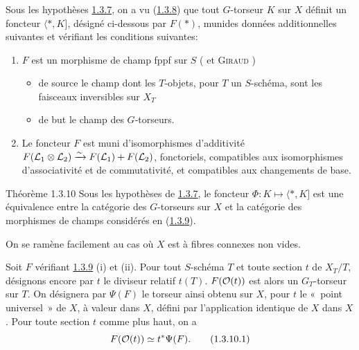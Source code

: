 \documentclass[10pt]{../fichiers-configuration-latex/smfart}
\begin{document}
\subsubsection{}
Sous les hypothèses \hyperref[XVIII.subsubsec1.3.7]{1.3.7}, 
on a vu (\hyperref[XVIII.for1.3.8]{1.3.8}) que tout $G$-torseur $K$
sur $X$ définit un foncteur $\langle \ast,K]$, désigné ci-dessous par
$F(\ast)$, 
muni\pageoriginale des données additionnelles suivantes et vérifiant
les conditions suivantes:
\begin{enumerate}
\renewcommand{\theenumi}{\roman{enumi}}
\renewcommand{\labelenumi}{(\theenumi)}
\item $F$ est un morphisme de champ fppf sur $S$
  ( et \textsc{Giraud} 
\cite{SGA4-18:1})
\begin{itemize}
\item[--] de source le champ dont les $T$-objets, pour $T$ un
$S$-schéma, sont les faisceaux inversibles sur $X_{T}$

\item[--] de but le champ des $G$-torseurs.
\end{itemize}

\item Le foncteur $F$ est muni d'isomorphismes d'additivité
$F({\mathcal L}_{1}\otimes {\mathcal L}_{2})\xrightarrow{\sim}F({\mathcal L}_{1})+F({\mathcal L}_{2})$,
fonctoriels, compatibles aux isomorphismes d'associativité et de
commutativité, et compatibles aux changements de base.
\end{enumerate}

\begin{enonce*}{Théorème 1.3.10}
Sous les hypothèses de \hyperref[XVIII.subsubsec1.3.7]{1.3.7}, le foncteur
$\Phi:K\mapsto \langle \ast,K]$ est 
une équivalence entre la catégorie des $G$-torseurs sur $X$ et la
catégorie des morphismes de champs considérés en
(\hyperref[XVIII.subsubsec1.3.9]{1.3.9}). 
\end{enonce*}

On se ramène facilement au cas où $X$ est à fibres connexes non vides.

Soit $F$ vérifiant \hyperref[XVIII.subsubsec1.3.9]{1.3.9} (i) et (ii). Pour tout
$S$-schéma $T$ et toute section $t$ de $X_{T}/T$, désignons encore par $t$ le diviseur
relatif $t(T)$. $F({\mathcal O}(t))$ est alors un $G_{T}$-torseur sur $T$. On
désignera par $\Psi(F)$ le torseur ainsi obtenu sur $X$, pour $t$ le
« point universel »  de $X$, à valeur dans $X$, défini par
l'application identique de $X$ dans $X$. Pour toute section $t$ comme
plus haut, on a
\begin{equation*}
F({\mathcal O}(t))\simeq t^{\ast}\Psi(F){}.\tag{1.3.10.1}
\end{equation*}
\end{document}
